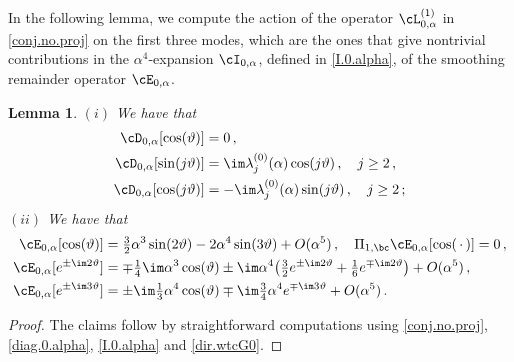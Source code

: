 \documentclass[a4paper,reqno,10pt]{article}
\newtheorem{lem}{Lemma}[section]
\begin{document}
In the following lemma, we compute the action of the operator $\cL_{0,\alpha}^{(1)}$ in \eqref{conj.no.proj} on the first three modes, which are the ones that give nontrivial contributions in the $\alpha^4$-expansion  $\cI_{0,\alpha}$, defined in \eqref{I.0.alpha}, of the smoothing remainder operator $\cE_{0,\alpha}$. %


\begin{lem} \label{lemma.modes123.E}
	$(i)$ We have that
	\begin{align}
	\cD_{0,\alpha}[\cos(\vartheta)] &= 0\,,\\%
		 \cD_{0,\alpha}[\sin(j\vartheta)] & = \im \lambda_{j}^{(0)}(\alpha) \cos(j\vartheta) \,, \quad j\geq 2 \,,  \\
	 \cD_{0,\alpha}[\cos(j\vartheta)] & = -\im \lambda_{j}^{(0)}(\alpha) \sin(j\vartheta) \,, \quad j\geq 2 \,;
	\end{align}
\noindent $(ii)$	We have that 
\begin{align}
			\cE_{0,\alpha}[\cos(\vartheta)] & = \tfrac32\alpha^3\sin(2\vartheta)- 2 \alpha^4\sin(3\vartheta)+ O(\alpha^5)\,,\quad \Pi_{1,\bc}\cE_{0,\alpha}[\cos(\,\cdot\,)]=0 \,, \\
		\cE_{0,\alpha}[e^{\pm \im 2\vartheta}] & = \mp \tfrac14 \im \alpha^3 \cos(\vartheta) \pm \im \alpha^4 \big( \tfrac{3}{2}e^{\pm \im 2 \vartheta} + \tfrac{1}{6}e^{\mp\im 2 \vartheta} \big) + O(\alpha^5) \,, \\
	\cE_{0,\alpha}[e^{\pm \im 3\vartheta}] & =  \pm \im \tfrac{1}{3} \alpha^4 \cos(\vartheta) \mp \im \tfrac34 \alpha^4 e^{\mp\im 3 \vartheta}  + O(\alpha^5) \,.
	\end{align}
\end{lem}
\begin{proof}
	The claims follow by  straightforward computations using  \eqref{conj.no.proj}, \eqref{diag.0.alpha}, \eqref{I.0.alpha}
    and \eqref{dir.wtcG0}.
\end{proof}
\end{document}
